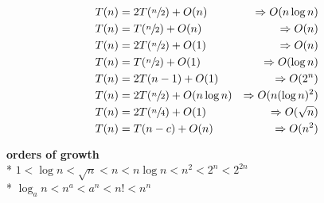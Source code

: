 \documentclass[10pt, landscape]{article}
\newenvironment{tightcenter}{%
  \setlength\topsep{0pt}
  \setlength\parskip{0pt}
  \begin{center}
}{%
  \end{center}
}
\begin{document}
\begin{multicols}{4}
\begin{tightcenter}
\begin{align*}T(n) &= 2T(\sfrac{n}{2}) + O(n) &\Rightarrow O(n \log n)
    \\ T(n) &= T(\sfrac{n}{2}) + O(n) &\Rightarrow O(n)
    \\ T(n) &= 2T(\sfrac{n}{2}) + O(1) &\Rightarrow O(n)
    \\ T(n) &= T(\sfrac{n}{2}) + O(1) &\Rightarrow O(\log n)
    \\ T(n) &= 2T(n - 1) + O(1) &\Rightarrow O(2^n)
    \\ T(n) &= 2T(\sfrac{n}{2}) + O(n \log n) &\Rightarrow O(n(\log n)^2)
    \\ T(n) &= 2T(\sfrac{n}{4}) + O(1) &\Rightarrow O(\sqrt{n})
    \\ T(n) &= T(n - c) + O(n) &\Rightarrow O(n^2)
\end{align*}

\textbf{orders of growth}
\\* $1 < \log n < \sqrt{n} < n < n \log n < n^2 < 2^n < 2^{2n}$
\\* $\log_a n < n^a < a^n < n! < n^n$ 
\end{tightcenter}

\end{multicols}

\end{document}
